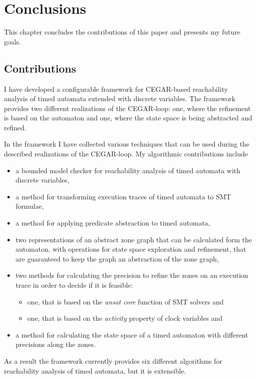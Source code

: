\chapter{Conclusions}\label{chap:concl}

This chapter concludes the contributions of this paper and presents my future goals.

\section{Contributions}

I have developed a configurable framework for CEGAR-based reachability analysis of timed automata extended with discrete variables. The framework provides two different realizations of the CEGAR-loop: one, where the refinement is based on the automaton and one, where the state space is being abstracted and refined.

In the framework I have collected various techniques that can be used during the described realizations of the CEGAR-loop. My algorithmic contributions include
\begin{itemize}
	\item a bounded model checker for reachability analysis of timed automata with discrete variables,
	\item a method for transforming execution traces of timed automata to SMT formulae, %
	\item a method for applying predicate abstraction to timed automata,
	\item two representations of an abstract zone graph that can be calculated form the automaton, with operations for state space exploration and refinement, that are guaranteed to keep the graph an abstraction of the zone graph,
	\item two methods for calculating the precision to refine the zones on an execution trace in order to decide if it is feasible:
	\begin{itemize}
		\item one, that is based on the \emph{unsat core} function of SMT solvers and
		\item one, that is based on the \emph{activity} property of clock variables and
	\end{itemize}
	\item a method for calculating the state space of a timed automaton with different precisions along the zones.
\end{itemize}

As a result the framework currently provides six different algorithms for reachability analysis of timed automata, but it is extensible.

